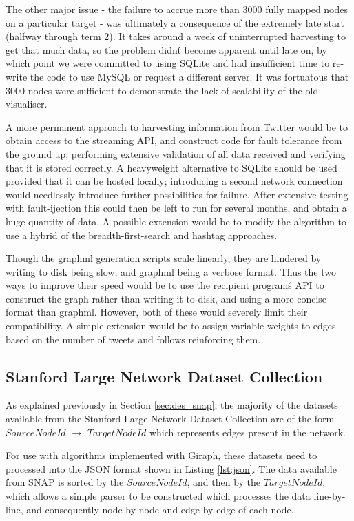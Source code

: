 The other major issue - the failure to accrue more than 3000 fully mapped nodes on a particular target - was ultimately a consequence of the extremely late start (halfway through term 2). It takes around a week of uninterrupted harvesting to get that much data, so the problem didn\'t become apparent until late on, by which point we were committed to using SQLite and had insufficient time to re-write the code to use MySQL or request a different server. It was fortuatous that 3000 nodes were sufficient to demonstrate the lack of scalability of the old visualiser.

A more permanent approach to harvesting information from Twitter would be to obtain access to the streaming API, and construct code for fault tolerance from the ground up; performing extensive validation of all data received and verifying that it is stored correctly. A heavyweight alternative to SQLite should be used provided that it can be hosted locally; introducing a second network connection would needlessly introduce further possibilities for failure. After extensive testing with fault-ijection this could then be left to run for several months, and obtain a huge quantity of data. A possible extension would be to modify the algorithm to use a hybrid of the breadth-first-search and hashtag approaches.

Though the graphml generation scripts scale linearly, they are hindered by writing to disk being slow, and graphml being a verbose format. Thus the two ways to improve their speed would be to use the recipient program\'s API to construct the graph rather than writing it to disk, and using a more concise format than graphml. However, both of these would severely limit their compatibility. A simple extension would be to assign variable weights to edges based on the number of tweets and follows reinforcing them.

\subsection{Stanford Large Network Dataset Collection}
As explained previously in Section \ref{sec:des_snap}, the majority of the datasets available from the Stanford Large Network Dataset Collection are of the form $SourceNodeId$ $\rightarrow$ $TargetNodeId$ which represents edges present in the network.

For use with algorithms implemented with Giraph, these datasets need to processed into the JSON format shown in Listing \ref{lst:json}. The data available from SNAP is sorted by the $SourceNodeId$, and then by the $TargetNodeId$, which allows a simple parser to be constructed which processes the data line-by-line, and consequently node-by-node and edge-by-edge of each node.

